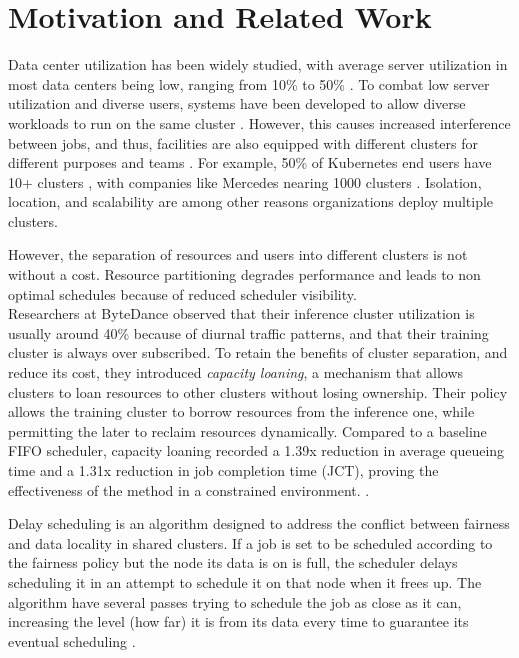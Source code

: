 \section{Motivation and Related Work}
Data center utilization has been widely studied, with average server utilization in most data centers being low, 
ranging from 10\% to 50\%
\cite{lo_heracles_2015}. 
To combat low server utilization and diverse users, systems have been developed to allow diverse workloads to run 
on the same cluster \cite{bhattacharya_hierarchical_2013, hindman_mesos_nodate}. 
However, this causes increased interference between jobs, and thus, 
facilities are also equipped with different clusters for different purposes and teams \cite{patel_what_2022, li_lyra_2023}. 
For example, 50\% of Kubernetes \cite{verma_large-scale_2015}
end users have 10+ clusters \cite{noauthor_cncf_2023} 
, with companies like Mercedes nearing 1000 clusters \cite{noauthor_mercedes-benz_2023}.
Isolation, location, and scalability are among other reasons organizations deploy multiple clusters.

However, the separation of resources and users into different clusters is not without a cost. 
Resource partitioning degrades performance %
and leads to non optimal schedules because of reduced scheduler visibility.\\ %
Researchers at ByteDance observed that their inference cluster utilization is usually around 40\% because 
of diurnal traffic patterns, and that their training cluster is always over subscribed. 
To retain the benefits of cluster separation, and reduce its cost, they introduced \textit{capacity loaning}, 
a mechanism that allows clusters to loan resources to other clusters without losing ownership.
Their policy allows the training cluster to borrow resources from the inference one, while permitting the 
later to reclaim resources dynamically. 
Compared to a baseline FIFO scheduler, capacity loaning recorded a 1.39x reduction in average queueing time and a 1.31x 
reduction in job completion time (JCT), proving the effectiveness of the method in a constrained environment. \cite{li_lyra_2023}.

Delay scheduling is an algorithm designed to address the conflict between fairness and data locality in 
shared clusters. 
If a job is set to be scheduled according to the fairness policy but the node its data is on is full, 
the scheduler delays scheduling it in an attempt to schedule it on that node when it frees up. The algorithm have 
several passes trying to schedule the job as close as it can, increasing the level (how far) it is from its data every time 
to guarantee its eventual scheduling \cite{zaharia_delay_2010}.
%

